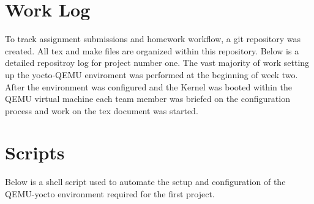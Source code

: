 \documentclass[10pt,onecolumn,draftclsnofoot]{IEEEtran} %
\begin{document}
\begin{singlespace}
\newpage
\section{\bf Work Log}
\normalfont \indent To track assignment submissions and homework workflow, a git repository was created. All tex and make files are organized within this repository. Below is a detailed repositroy log for project number one. The vast majority of work setting up the yocto-QEMU enviroment was performed at the beginning of week two. After the environment was configured and the Kernel was booted within the QEMU virtual machine each team member was briefed on the configuration process and work on the tex document was started. \hfill\break

        \begin{center}
                
        \end{center}
	\hfill\break

\section{\bf Scripts}
\normalfont \indent Below is a shell script used to automate the setup and configuration of the QEMU-yocto environment required for the first project.
\newline




\end{singlespace}
\restoregeometry
\end{document}
